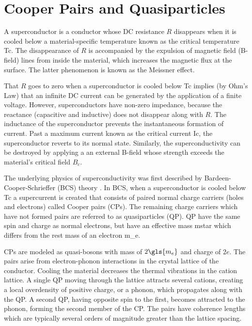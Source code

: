 \section{Cooper Pairs and Quasiparticles}\label{sec:supercond}

A superconductor is a conductor whose DC resistance $R$ disappears when it is cooled below a material-specific temperature known as the critical temperature \gls{Tc}. The disappearance of $R$ is accompanied by the expulsion of magnetic field (B-field) lines from inside the material, which increases the magnetic flux at the surface. The latter phenomenon is known as the Meissner effect.

That $R$ goes to zero when a superconductor is cooled below \gls{Tc} implies (by Ohm's Law) that an infinite DC current can be generated by the application of a finite voltage. However, superconductors have non-zero impedance, because the reactance (capacitive and inductive) does not disappear along with $R$. The inductance of the superconductor prevents the instantaneous formation of current. Past a maximum current known as the critical current \gls{Ic}, the superconductor reverts to its normal state. Similarly, the superconductivity can be destroyed by applying a an external B-field whose strength exceeds the material's critical field $B_{c}$.

The underlying physics of superconductivity was first described by Bardeen-Cooper-Schrieffer (BCS) theory \citep{bardeen1957theory}. In BCS, when a superconductor is cooled below \gls{Tc} a supercurrent is created that consists of paired normal charge carriers (holes and electrons) called Cooper pairs (CPs). The remaining charge carriers which have not formed pairs are referred to as quasiparticles (QP). QP have the same spin and charge as normal electrons, but have an effective mass \gls{mstar} which differs from the rest mass of an electron \gls{m_e}.

CPs are modeled as quasi-bosons with mass of $2\gls{m_e}$ and charge of $2e$. The pairs arise from electron-phonon interactions in the crystal lattice of the conductor. Cooling the material decreases the thermal vibrations in the cation lattice. A single QP moving through the lattice attracts several cations, creating a local overdensity of positive charge, or a phonon, which propagates along with the QP. A second QP, having opposite spin to the first, becomes attracted to the phonon, forming the second member of the CP. The pairs have coherence lengths which are typically several orders of magnitude greater than the lattice spacing.

